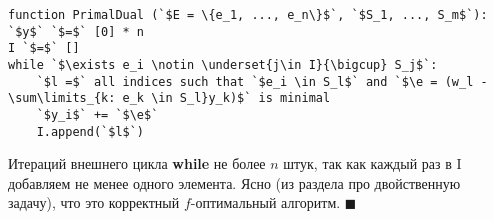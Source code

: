 \begin{lstlisting}[escapeinside=``]
function PrimalDual (`$E = \{e_1, ..., e_n\}$`, `$S_1, ..., S_m$`):
`$y$` `$=$` [0] * n
I `$=$` []
while `$\exists e_i \notin \underset{j\in I}{\bigcup} S_j$`:
    `$l =$` all indices such that `$e_i \in S_l$` and `$\e = (w_l - \sum\limits_{k: e_k \in S_l}y_k)$` is minimal
    `$y_i$` += `$\e$`
    I.append(`$l$`)
\end{lstlisting}

Итераций внешнего цикла \textbf{while} не более $n$ штук, так как каждый раз в I добавляем не менее одного элемента. Ясно (из раздела про двойственную задачу), что это корректный $f$-оптимальный алгоритм. $\blacksquare$